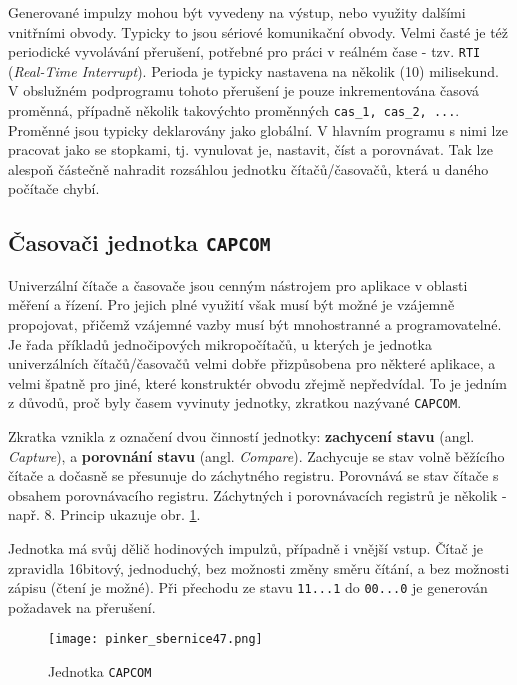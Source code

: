         Generované impulzy mohou být vyvedeny na výstup, nebo využity dalšími vnitřními obvody. 
        Typicky to jsou sériové komunikační obvody. Velmi časté je též periodické vyvolávání 
        přerušení, potřebné pro práci v reálném čase - tzv. \texttt{RTI} (\emph{Real-Time 
        Interrupt}). Perioda je typicky nastavena na několik (10) milisekund. V obslužném 
        podprogramu tohoto přerušení je pouze inkrementována časová proměnná, případně několik 
        takovýchto proměnných \texttt{cas\_1, cas\_2, ...}. Proměnné jsou typicky 
        deklarovány jako globální. V hlavním programu s nimi lze pracovat jako se stopkami, tj. 
        vynulovat je, nastavit, číst a porovnávat. Tak lze alespoň částečně nahradit rozsáhlou 
        jednotku čítačů/časovačů, která u daného počítače chybí.
        
    \subsection{Časovači jednotka \texttt{CAPCOM}}
      Univerzální čítače a časovače jsou cenným nástrojem pro aplikace v oblasti měření a řízení. 
      Pro jejich plné využití však musí být možné je vzájemně propojovat, přičemž vzájemné vazby 
      musí být mnohostranné a programovatelné. Je řada příkladů jednočipových mikropočítačů, u 
      kterých je jednotka univerzálních čítačů/časovačů velmi dobře přizpůsobena pro některé 
      aplikace, a velmi špatně pro jiné, které konstruktér obvodu zřejmě nepředvídal. To je jedním 
      z důvodů, proč byly časem vyvinuty jednotky, zkratkou nazývané \texttt{CAPCOM}.
      
      Zkratka vznikla z označení dvou činností jednotky: \textbf{zachycení stavu} (angl. 
      \emph{Capture}), a \textbf{porovnání stavu} (angl. \emph{Compare}). Zachycuje se stav volně 
      běžícího čítače a dočasně se přesunuje do záchytného registru. Porovnává se stav čítače s 
      obsahem porovnávacího registru. Záchytných i porovnávacích registrů je několik - např. 8. 
      Princip ukazuje obr. \ref{MIT:fig_sbernice47}.
      
      Jednotka má svůj dělič hodinových impulzů, případně i vnější vstup. Čítač je zpravidla 
      16bitový, jednoduchý, bez možnosti změny směru čítání, a bez možnosti zápisu (čtení je 
      možné). Při přechodu ze stavu \texttt{11...1} do \texttt{00...0} je generován požadavek na 
      přerušení.
      
      \begin{figure}[ht!] %
        \centering
        \texttt{[image: pinker\_sbernice47.png]}
        \caption{Jednotka \texttt{CAPCOM}}
        \label{MIT:fig_sbernice47}
      \end{figure}
      

